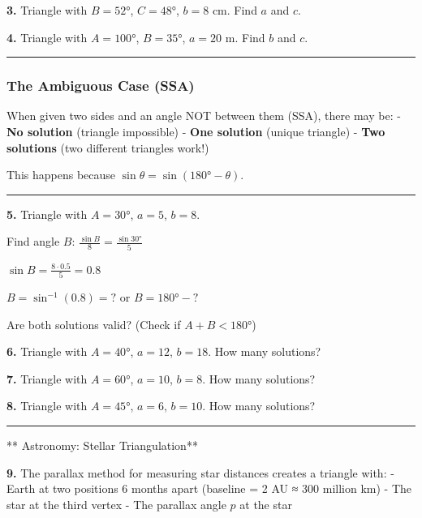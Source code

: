 \documentclass[
  11pt,
]{article}
\begin{document}
\textbf{3.} Triangle with \(B = 52°\), \(C = 48°\), \(b = 8\) cm. Find
\(a\) and \(c\).

\textbf{4.} Triangle with \(A = 100°\), \(B = 35°\), \(a = 20\) m. Find
\(b\) and \(c\).

\begin{center}\rule{0.5\linewidth}{0.5pt}\end{center}

\hypertarget{the-ambiguous-case-ssa}{%
\subsubsection{The Ambiguous Case (SSA)}\label{the-ambiguous-case-ssa}}

When given two sides and an angle NOT between them (SSA), there may be:
- \textbf{No solution} (triangle impossible) - \textbf{One solution}
(unique triangle) - \textbf{Two solutions} (two different triangles
work!)

This happens because \(\sin\theta = \sin(180° - \theta)\).

\begin{center}\rule{0.5\linewidth}{0.5pt}\end{center}

\textbf{5.} Triangle with \(A = 30°\), \(a = 5\), \(b = 8\).

Find angle \(B\): \(\frac{\sin B}{8} = \frac{\sin 30°}{5}\)

\(\sin B = \frac{8 \cdot 0.5}{5} = 0.8\)

\(B = \sin^{-1}(0.8) = ?\) or \(B = 180° - ?\)

Are both solutions valid? (Check if \(A + B < 180°\))

\textbf{6.} Triangle with \(A = 40°\), \(a = 12\), \(b = 18\). How many
solutions?

\textbf{7.} Triangle with \(A = 60°\), \(a = 10\), \(b = 8\). How many
solutions?

\textbf{8.} Triangle with \(A = 45°\), \(a = 6\), \(b = 10\). How many
solutions?

\begin{center}\rule{0.5\linewidth}{0.5pt}\end{center}

** Astronomy: Stellar Triangulation**

\textbf{9.} The parallax method for measuring star distances creates a
triangle with: - Earth at two positions 6 months apart (baseline = 2 AU
≈ 300 million km) - The star at the third vertex - The parallax angle
\(p\) at the star
\end{document}
